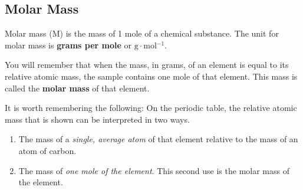             \subsection*{Molar Mass}
            \nopagebreak
\par
            \label{m38717*fhsst!!!underscore!!!id147}
 { \label{m38717*meaningfhsst!!!underscore!!!id147}
      \label{m38717*id276397}Molar mass (M) is the mass of 1 mole of a chemical substance. The unit for molar mass is \textbf{grams per mole} or $\text{g}\ensuremath{\cdot}\text{mol}{}^{-1}$. \par 
       } 
      \label{m38717*id276429}You will remember that when the mass, in grams, of an element is equal to its relative atomic mass, the sample contains one mole of that element. This mass is called the \textbf{molar mass} of that element.\par 
{} \label{m38717*id276445}It is worth remembering the following: On the periodic table, the relative atomic mass that is shown can be interpreted in two ways.\par 
      \label{m38717*id276451}\begin{enumerate}[noitemsep, label=\textbf{\arabic*}. ] 
            \label{m38717*uid9}\item The mass of a \textsl{single, average atom} of that element relative to the mass of an atom of carbon.
\label{m38717*uid10}\item The mass of \textsl{one mole of the element}. This second use is the molar mass of the element.
\end{enumerate}
